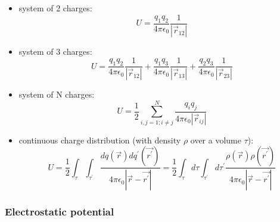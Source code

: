 \documentclass[english,11pt]{article}
\begin{document}
          \begin{itemize}
          \item system of 2 charges:
           \begin{equation*}
                U = \frac{q_1 q_2}{4\pi\epsilon_0} \frac{1}{|\vec{r}_{12}|}
           \end{equation*}

          \item system of 3 charges:
           \begin{equation*}
             U = \frac{q_1 q_2}{4\pi\epsilon_0} \frac{1}{|\vec{r}_{12}|} +
                 \frac{q_1 q_3}{4\pi\epsilon_0} \frac{1}{|\vec{r}_{13}|} +
                 \frac{q_2 q_3}{4\pi\epsilon_0} \frac{1}{|\vec{r}_{23}|}
           \end{equation*}

          \item system of N charges:
           \begin{equation*}
             U = \frac{1}{2} \sum_{i,j=1;i{\ne}j}^{N} \frac{q_i q_j}{4\pi\epsilon_0|\vec{r}_{ij}|}
           \end{equation*}

          \item continuous charge distribution (with density $\rho$ over a volume $\tau$):
           \begin{equation*}
              U = \frac{1}{2} \int_{\tau} \int_{\tau^{\prime}}
                \frac{dq(\vec{r}) dq^{\prime}(\vec{r^{\prime}})}{4\pi\epsilon_0|\vec{r} - \vec{r^{\prime}}|}
                = \frac{1}{2} \int_{\tau} d\tau \int_{\tau^{\prime}} d\tau^{\prime}
                  \frac{\rho(\vec{r}) \rho(\vec{r^{\prime}})}{4\pi\epsilon_0|\vec{r} - \vec{r^{\prime}}|}
           \end{equation*}

          \end{itemize}

\subsubsection*{\bf Electrostatic potential}
\end{document}
